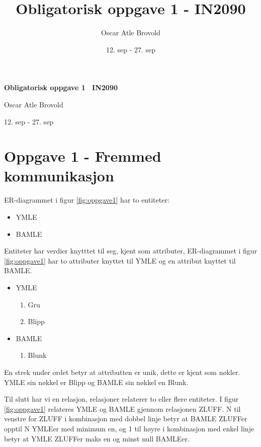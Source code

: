 \documentclass{article}
\title{Obligatorisk oppgave 1 - IN2090}
\author{Oscar Atle Brovold}
\date{12. sep - 27. sep}
\begin{document}
\onehalfspacing

\begin{titlepage} %
    \centering
    \vspace*{5cm} %
    {\Huge \bfseries Obligatorisk oppgave 1 \ IN2090\par}
    \vspace{1.5cm}
    {\Large Oscar Atle Brovold\par}
    \vspace{1.5cm}
    {\Large 12. sep - 27. sep\par} %
    \vfill
\end{titlepage}

\newpage %

\section*{Oppgave 1 - Fremmed kommunikasjon}
ER-diagrammet i figur \ref{fig:oppgave1} har to entiteter:\
\begin{itemize}
    \item YMLE
    \item BAMLE
\end{itemize}
Entiteter har verdier knytttet til seg, kjent som attributer, ER-diagrammet i figur \ref{fig:oppgave1}
har to attributer knyttet til YMLE og en attribut knyttet til BAMLE. 
\begin{itemize}
    \item YMLE
    \begin{enumerate}
        \item Gru
        \item Blipp 
    \end{enumerate}
    \item BAMLE
    \begin{enumerate}
        \item Blunk
    \end{enumerate}
\end{itemize}

En strek under ordet betyr at attributten er unik, dette er kjent som nøkler. YMLE sin nøkkel er
Blipp og BAMLE sin nøkkel en Blunk. 

Til slutt har vi en relasjon, relasjoner relaterer to eller flere entiteter. I figur \ref{fig:oppgave1}
relateres YMLE og BAMLE gjennom relasjonen ZLUFF. N til venstre for ZLUFF
i kombinasjon med dobbel linje betyr at BAMLE ZLUFFer opptil N YMLEer med minimum en, og 1 til høyre 
i kombinasjon med enkel linje betyr at YMLE ZLUFFer maks en og minst null BAMLEer.
\end{document}
